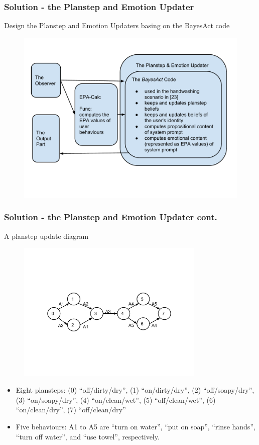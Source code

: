 \documentclass{beamer}
\begin{document}
\begin{frame}
\frametitle{Solution - the Planstep and Emotion Updater}
Design the Planstep and Emotion Updaters basing on the BayesAct code
\begin{figure}[htp]
\centering
\includegraphics[trim = 4mm 30mm 5mm 15mm, clip, width=0.9\linewidth]{fig/fig-updater.pdf}
\label{fig:updater}
\end{figure}
\end{frame}

\begin{frame}
\frametitle{Solution - the Planstep and Emotion Updater cont.}
A planstep update diagram
\begin{figure}[htp]
\centering
\includegraphics[trim = 20mm 50mm 20mm 50mm, clip, width=0.8\textwidth]{fig/fig-planstep.pdf}
\label{fig:planstep}
\end{figure}
\begin{itemize}
\pause \item Eight plansteps: (0) ``off/dirty/dry'', (1) ``on/dirty/dry'', (2) ``off/soapy/dry'', (3) ``on/soapy/dry'', (4) ``on/clean/wet'', (5) ``off/clean/wet'', (6) ``on/clean/dry'', (7) ``off/clean/dry''
\pause \item Five behaviours: A1 to A5 are ``turn on water'', ``put on soap'', ``rinse hands'', ``turn off water'', and ``use towel'', respectively.
\end{itemize}
\end{frame}
\end{document}
